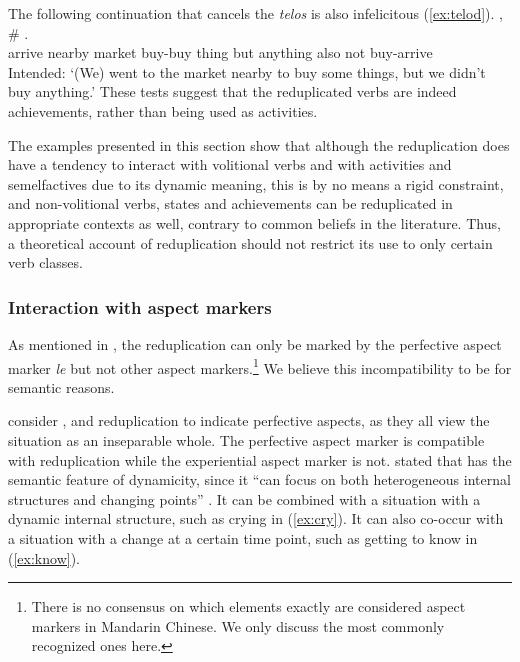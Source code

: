 \z\z
The following continuation that cancels the \textit{telos} is also infelicitous (\ref{ex:telod}).
\ea\label{ex:telod} %
\gll {}    , \#     .\\
arrive nearby market buy-buy thing {} but anything also not buy-arrive\\
\glt Intended: `(We) went to the market nearby to buy some things, but we didn't buy anything.'
\z
These tests suggest that the reduplicated verbs are indeed achievements,
rather than being used as activities.

The examples presented in this section show that although the reduplication does have a tendency to interact with volitional verbs and with activities and semelfactives due to its dynamic meaning, 
this is by no means a rigid constraint, 
and non\hyp{}volitional verbs, states and achievements can be reduplicated in appropriate contexts as well,
 contrary to common beliefs in the literature.
Thus, a theoretical account of reduplication should not restrict its use to only certain verb classes.




\subsubsection{Interaction with aspect markers}\label{sec:aspM}

As mentioned in , the reduplication can only be marked by the perfective aspect marker \textit{le} but not other aspect markers.\footnote{
There is no consensus on which elements exactly are considered aspect markers in Mandarin Chinese. 
We only discuss the most commonly recognized ones here.
}
We believe this incompatibility to be for semantic reasons.

\citet[Ch. 4]{XiaoMcEnery2004} consider ,  and reduplication to indicate perfective aspects, as they all view the situation as an inseparable whole.
The perfective aspect marker  is compatible with reduplication while the experiential aspect marker  is not.
\citet[128--131]{XiaoMcEnery2004} stated that  has the semantic feature of dynamicity, since it ``can focus on both heterogeneous internal structures and changing points'' \citep[129]{XiaoMcEnery2004}.
It can be combined with a situation with a dynamic internal structure, such as crying in (\ref{ex:cry}).
It can also co\hyp{}occur with a situation with a change at a certain time point, such as getting to know in (\ref{ex:know}).

